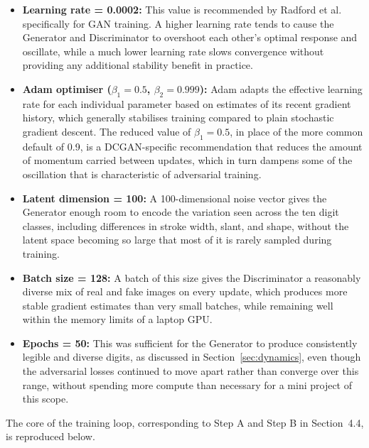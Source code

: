\documentclass[12pt,a4paper]{article}
\begin{document}
\begin{itemize}
    \item \textbf{Learning rate = 0.0002:} This value is recommended by
          Radford et al.\ \cite{radford2015} specifically for GAN training. A higher
          learning rate tends to cause the Generator and Discriminator to overshoot each
          other's optimal response and oscillate, while a much lower learning rate slows
          convergence without providing any additional stability benefit in practice.
    \item \textbf{Adam optimiser ($\beta_1 = 0.5$, $\beta_2 = 0.999$):} Adam adapts the
          effective learning rate for each individual parameter based on estimates of its
          recent gradient history, which generally stabilises training compared to plain
          stochastic gradient descent. The reduced value of $\beta_1 = 0.5$, in place of
          the more common default of 0.9, is a DCGAN-specific recommendation
          \cite{radford2015} that reduces the amount of momentum carried between updates,
          which in turn dampens some of the oscillation that is characteristic of
          adversarial training.
    \item \textbf{Latent dimension = 100:} A 100-dimensional noise vector gives the
          Generator enough room to encode the variation seen across the ten digit
          classes, including differences in stroke width, slant, and shape, without the
          latent space becoming so large that most of it is rarely sampled during
          training.
    \item \textbf{Batch size = 128:} A batch of this size gives the Discriminator a
          reasonably diverse mix of real and fake images on every update, which produces
          more stable gradient estimates than very small batches, while remaining well
          within the memory limits of a laptop GPU.
    \item \textbf{Epochs = 50:} This was sufficient for the Generator to produce
          consistently legible and diverse digits, as discussed in
          Section~\ref{sec:dynamics}, even though the adversarial losses continued to
          move apart rather than converge over this range, without spending more compute
          than necessary for a mini project of this scope.
\end{itemize}

The core of the training loop, corresponding to Step A and Step B in
Section~4.4, is reproduced below.
\end{document}
